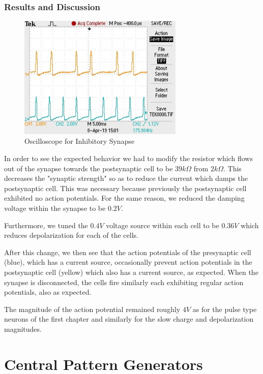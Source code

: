 \documentclass[12]{book}
\newcommand\0{\mathbf{0}}
\newcommand\<{\langle}
\renewcommand\>{\rangle}
\begin{document}
\subsection{Results and Discussion}

\begin{figure}[h]
\centering
\includegraphics[width=0.7\textwidth]{inhibitory.jpg}	
\caption{Oscilloscope for Inhibitory Synapse}
\end{figure}

In order to see the expected behavior we had to modify the resistor which flows out of the synapse towards the postsynaptic cell to be $39k \Omega$ from $2k \Omega$. This decreases the "synaptic strength" so as to reduce the current which damps the postsynaptic cell. This was necessary because previously the postsynaptic cell exhibited no action potentials. For the same reason, we reduced the damping voltage within the synapse to be $0.2 V$. 

Furthermore, we tuned the $0.4 V$ voltage source within each cell to be $0.36 V$ which reduces depolarization for each of the cells. 

After this change, we then see that the action potentials of the presynaptic cell (blue), which has a current source, occasionally prevent action potentials in the postsynaptic cell (yellow) which also has a current source, as expected. When the synapse is disconnected, the cells fire similarly each exhibiting regular action potentials, also as expected.

The magnitude of the action potential remained roughly $4V$ as for the pulse type neurons of the first chapter and similarly for the slow charge and depolarization magnitudes. 
\chapter{Central Pattern Generators}
\end{document}
